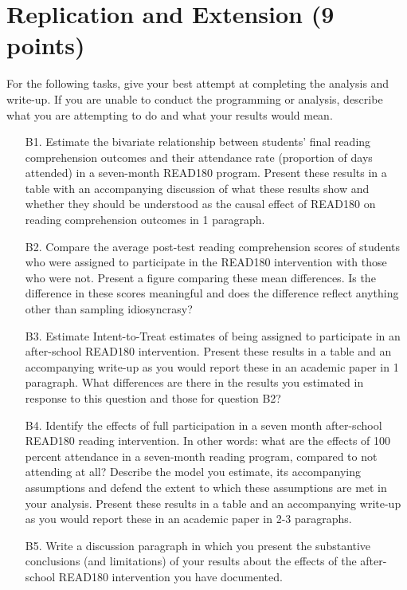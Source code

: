 \documentclass[a4paper, 11pt]{article}
\begin{document}
\section{Replication and Extension (9 points)}
For the following tasks, give your best attempt at completing the analysis and write-up. If you are unable to conduct the programming or analysis, describe what you are attempting to do and what your results would mean. 

\begin{enumerate}
	\item[B1.] Estimate the bivariate relationship between students' final reading comprehension outcomes and their attendance rate (proportion of days attended) in a seven-month READ180 program. Present these results in a table with an accompanying discussion of what these results show and whether they should be understood as the causal effect of READ180 on reading comprehension outcomes in 1 paragraph.
	\item[B2.] Compare the average post-test reading comprehension scores of students who were assigned to participate in the READ180 intervention with those who were not. Present a figure comparing these mean differences. Is the difference in these scores meaningful and does the difference reflect anything other than sampling idiosyncrasy? 
	\item[B3.] Estimate Intent-to-Treat estimates of being assigned to participate in an after-school READ180 intervention. Present these results in a table and an accompanying write-up as you would report these in an academic paper in 1 paragraph. What differences are there in the results you estimated in response to this question and those for question B2?
	\item[B4.] Identify the effects of full participation in a seven month after-school READ180 reading intervention. In other words: what are the effects of 100 percent attendance in a seven-month reading program, compared to not attending at all? Describe the model you estimate, its accompanying assumptions and defend the extent to which these assumptions are met in your analysis. Present these results in a table and an accompanying write-up as you would report these in an academic paper in 2-3 paragraphs.
	\item[B5.] Write a discussion paragraph in which you present the substantive conclusions (and limitations) of your results about the effects of the after-school READ180 intervention you have documented.
	
\end{enumerate}
\end{document}
